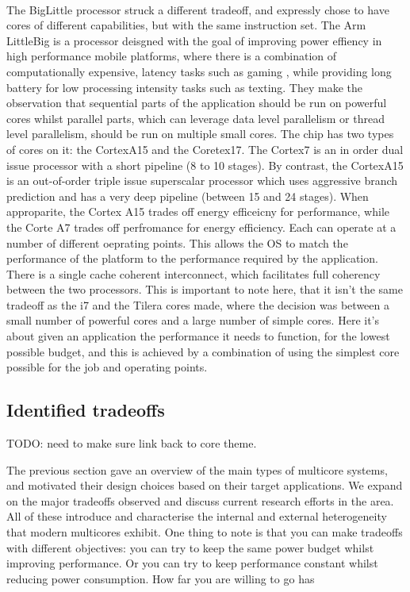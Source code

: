 \paragraph{} The BigLittle processor struck a different tradeoff,
and expressly chose to have cores of different capabilities, but
with the same instruction set. The Arm LittleBig is a processor
deisgned with the goal of improving power effiency in high
performance mobile platforms, where there is a combination
of computationally expensive, latency tasks such as gaming
, while providing long battery for low processing intensity tasks such
as texting. They make the observation that
sequential parts of the application should be run
on powerful cores whilst parallel parts, which can leverage data
level parallelism or thread level parallelism, should be run
on multiple small cores. The chip has two types of cores
on it: the CortexA15 and the Coretex17. The Cortex7 is an in order dual issue
processor with a short pipeline (8 to 10 stages). By contrast,  the CortexA15
 is an out-of-order triple issue superscalar processor
which uses aggressive branch prediction and has a very deep pipeline
(between 15 and 24 stages).  When approparite, the Cortex A15 trades off energy
efficeicny for performance, while the Corte A7 trades off perfromance for energy efficiency.
Each can operate at a number of different oeprating points. This allows the OS 
to match the performance of the platform to the performance required by the application. 
There is a single cache coherent interconnect,  which 
facilitates full coherency between the two processors. 
This is important to note here, that it isn't the same tradeoff
as the i7 and the Tilera cores made, where the decision was between
a small number of powerful cores and a large number of simple cores. 
Here it's about given an application the performance it needs to function,
for the lowest possible budget, and this is achieved by a combination of 
using the simplest core possible for the job and operating points. 

\subsection{Identified tradeoffs}
TODO: need to make sure link back to core theme. 

The previous section gave an overview of the main types of multicore systems, 
and motivated their design choices based on their target applications. 
We expand on the major tradeoffs observed and discuss current research efforts in the area. 
All of these introduce and characterise the internal and external heterogeneity that 
modern multicores exhibit. 
One thing to note is that you can make tradeoffs with different objectives:
you can try to keep the same power budget whilst improving performance. Or
you can try to keep performance constant whilst reducing power consumption. 
How far you are willing to go has

